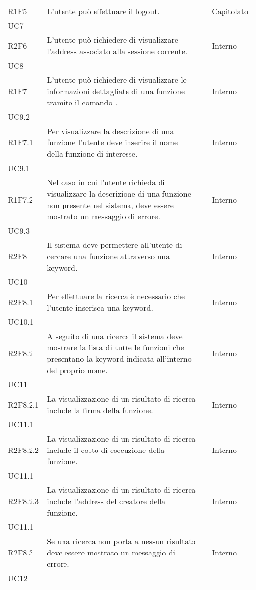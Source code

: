 \begin{longtable}{ 
		>{\centering}p{} 
		>{}p{} 
		>{\centering}p{}
		>{\centering}p{} }
	R1F5 & L'utente può effettuare il logout. 										& \ob & Capitolato \\ UC7 \tabularnewline 
	
	R2F6 & L'utente può richiedere di visualizzare l'address 
			associato alla sessione corrente. 										& \de & Interno \\ UC8 \tabularnewline
	
	R1F7 & L'utente può richiedere di visualizzare le informazioni dettagliate di una funzione
		tramite il comando \info{}.													& \ob & Interno \\ UC9.2 \tabularnewline
	R1F7.1 & Per visualizzare la descrizione di una funzione l'utente deve inserire 
		il nome della funzione di interesse.											& \ob & Interno \\ UC9.1 \tabularnewline
	R1F7.2 & Nel caso in cui l'utente richieda di visualizzare la descrizione di una 
		funzione non presente nel sistema, deve essere mostrato un messaggio di
		errore.															 			& \ob & Interno \\ UC9.3 \tabularnewline
	
	R2F8 & Il sistema deve permettere all'utente di cercare una funzione 
		attraverso una keyword. 														& \de & Interno \\ UC10 \tabularnewline
	R2F8.1 & Per effettuare la ricerca è necessario che l'utente inserisca 
		una keyword. 																& \de & Interno \\ UC10.1 \tabularnewline
	R2F8.2 & A seguito di una ricerca il sistema deve mostrare la lista di
	 tutte le funzioni che presentano la keyword indicata 
	 all'interno del proprio nome.													& \de & Interno \\ UC11 \tabularnewline
	R2F8.2.1 & La visualizzazione di un risultato di ricerca include
		 la firma della funzione.													& \de & Interno \\ UC11.1 \tabularnewline
  	R2F8.2.2 & La visualizzazione di un risultato di ricerca include
		  il costo di esecuzione della funzione.										& \de & Interno \\ UC11.1 \tabularnewline
  	R2F8.2.3 & La visualizzazione di un risultato di ricerca include
		  l'address del creatore della funzione.										& \de & Interno \\ UC11.1 \tabularnewline
	R2F8.3 & Se una ricerca non porta a nessun risultato deve essere mostrato un 
		messaggio di errore. 														& \de & Interno \\ UC12 	\tabularnewline	
	

\end{longtable}
